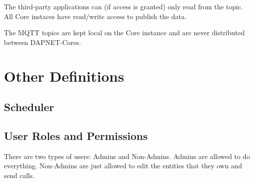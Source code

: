 The third-party applications can (if access is granted) only read from the
topic. All Core instaces have read/write access to publish the data.

The MQTT topics are kept local on the Core instance and are never distributed
between DAPNET-Cores.

\section{Other Definitions}

\subsection{Scheduler}
\label{dapnetdef:other:scheduler}

\subsection{User Roles and Permissions}
There are two types of users: Admins and Non-Admins. Admins are allowed to do
everything. Non-Admins are just allowed to edit the entities that they own and
send calls.
